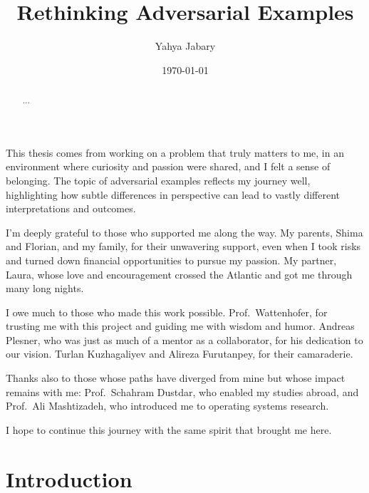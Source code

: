 \documentclass[a4paper, oneside]{discothesis}
\title{Rethinking Adversarial Examples}
\author{Yahya Jabary}
\institute{Computer Engineering and Networks Laboratory \\[2pt] ETH Zürich}
\date{\today}
\begin{document}
\frontmatter %
\maketitle

\cleardoublepage

\begin{acknowledgements}
	This thesis comes from working on a problem that truly matters to me, in an environment where curiosity and passion were shared, and I felt a sense of belonging. The topic of adversarial examples reflects my journey well, highlighting how subtle differences in perspective can lead to vastly different interpretations and outcomes.

	I'm deeply grateful to those who supported me along the way. My parents, Shima and Florian, and my family, for their unwavering support, even when I took risks and turned down financial opportunities to pursue my passion. My partner, Laura, whose love and encouragement crossed the Atlantic and got me through many long nights.
	
	I owe much to those who made this work possible. Prof.\ Wattenhofer, for trusting me with this project and guiding me with wisdom and humor. Andreas Plesner, who was just as much of a mentor as a collaborator, for his dedication to our vision. Turlan Kuzhagaliyev and Alireza Furutanpey, for their camaraderie.
	
	Thanks also to those whose paths have diverged from mine but whose impact remains with me: Prof.\ Schahram Dustdar, who enabled my studies abroad, and Prof.\ Ali Mashtizadeh, who introduced me to operating systems research.
	
	I hope to continue this journey with the same spirit that brought me here.
\end{acknowledgements}

\begin{abstract}
	...
\end{abstract}

\tableofcontents

\mainmatter %

\chapter{Introduction}

\end{document}

